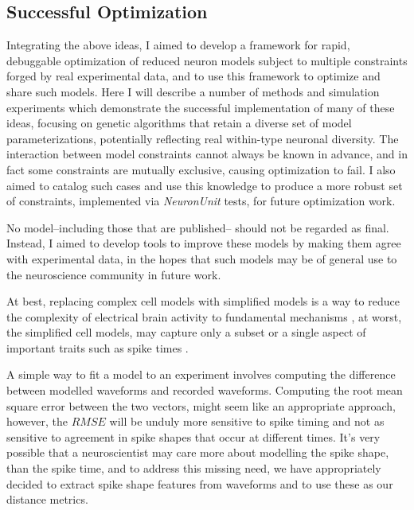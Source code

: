 \subsection{Successful Optimization} 
Integrating the above ideas, I aimed to develop a framework for rapid, debuggable optimization of reduced neuron models subject to multiple constraints forged by real experimental data, and to use this framework to optimize and share such models.
Here I will describe a number of methods and simulation experiments which demonstrate the successful implementation of many of these ideas, focusing on genetic algorithms that retain a diverse set of model parameterizations, potentially reflecting real within-type neuronal diversity.
The interaction between model constraints cannot always be known in advance, and in fact some constraints are mutually exclusive, causing optimization to fail.
I also aimed to catalog such cases and use this knowledge to produce a more robust set of constraints, implemented via \emph{NeuronUnit} tests, for future optimization work.

No model--including those that are published-- should not be regarded as final.
Instead, I aimed to develop tools to improve these models by making them agree with experimental data, in the hopes that such models may be of general use to the neuroscience community in future work.

At best, replacing complex cell models with simplified models is a way to reduce the complexity of electrical brain activity to fundamental mechanisms \cite{teeter2018generalized}, at worst, the simplified cell models, may capture only a subset or a single aspect of important traits such as spike times \cite{hertag2012approximation}. %

A simple way to fit a model to an experiment involves computing the difference between modelled waveforms and recorded waveforms. Computing the root mean square error between the two vectors, might seem like an appropriate approach, however, the $RMSE$  will be unduly more sensitive to spike timing and not as sensitive to agreement in spike shapes that occur at different times. It's very possible that a neuroscientist may care more about modelling the spike shape, than the spike time, and to address this missing need, we have appropriately decided to extract spike shape features from waveforms and to use these as our distance metrics.




